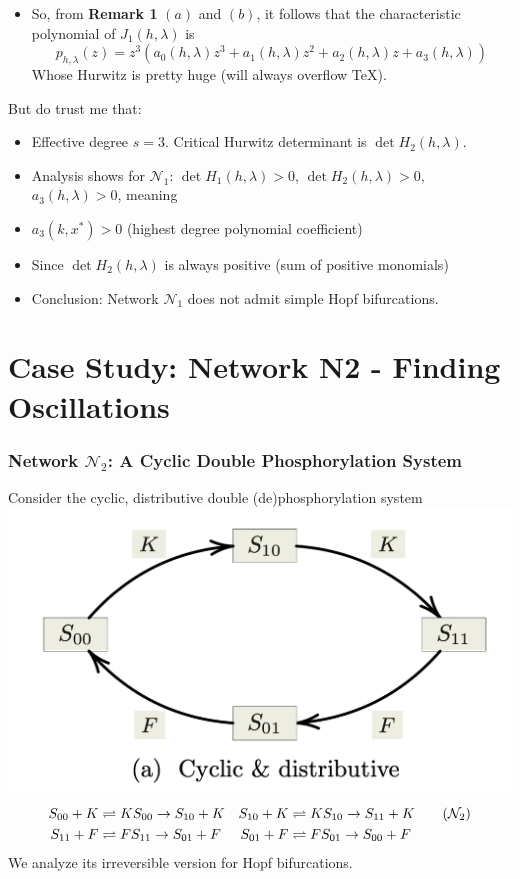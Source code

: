 \documentclass[aspectratio=169]{beamer}
\begin{document}
\begin{frame}
	\begin{itemize}
		\item So, from \textbf{Remark 1} $(a)$ and $(b)$, it follows that the characteristic polynomial of $J_1(h, \lambda)$ is
			\[
				p_{h,\lambda}(z) = z^3 (a_0(h,\lambda) z^3 + a_1(h,\lambda) z^2 + a_2(h,\lambda) z + a_3(h,\lambda))
			\]
			Whose Hurwitz is pretty huge (will always overflow \TeX).
	\end{itemize}
	But do trust me that:
	\begin{itemize}
		\item Effective degree $s=3$. Critical Hurwitz determinant is $\det H_2(h,\lambda)$.
		\item Analysis shows for $\mathcal{N}_1$:
			$\det H_1(h, \lambda) > 0$, $\det H_2(h, \lambda) > 0$, $a_3(h, \lambda) > 0$, meaning
		\item $a_3(k, x^*) > 0$ (highest degree polynomial coefficient)
		\item Since $\det H_2(h, \lambda)$ is always positive (sum of positive monomials)
		\item \alert{Conclusion}: Network $\mathcal{N}_1$ does not admit simple Hopf bifurcations.
	\end{itemize}
\end{frame}

\section{Case Study: Network N2 - Finding Oscillations}

\begin{frame}{\insertsectionhead}
	\frametitle{Network $\mathcal{N}_2$: A Cyclic Double Phosphorylation System}
	Consider the cyclic, distributive double (de)phosphorylation system
	\centering
	\includegraphics[width=0.6\linewidth]{pics/cyclic-distributive-n1.png} \\
	\begin{align*}
		S_{00} + K &\rightleftharpoons KS_{00} \rightarrow S_{10} + K & S_{10} + K &\rightleftharpoons KS_{10} \rightarrow S_{11} + K \tag{$\mathcal{N}_2$} \\
		S_{11} + F &\rightleftharpoons FS_{11} \rightarrow S_{01} + F & S_{01} + F &\rightleftharpoons FS_{01} \rightarrow S_{00} + F
	\end{align*}
	We analyze its \alert{irreversible version} for Hopf bifurcations.
\end{frame}
\end{document}
